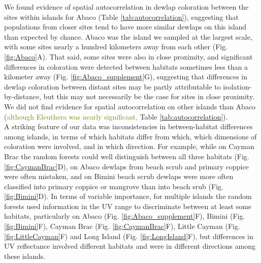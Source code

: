 We found evidence of spatial autocorrelation in dewlap coloration between the sites within islands for Abaco (Table \ref{tab:autocorrelation}), suggesting that populations from closer sites tend to have more similar dewlaps on this island than expected by chance. Abaco was the island we sampled at the largest scale, with some sites nearly a hundred kilometers away from each other (Fig. \ref{fig:Abaco}A). That said, some sites were also in close proximity, and significant differences in coloration were detected between habitats sometimes less than a kilometer away (Fig. \ref{fig:Abaco_supplement}G), suggesting that differences in dewlap coloration between distant sites may be partly attributable to isolation-by-distance, but this may not necessarily be the case for sites in close proximity. We did not find evidence for spatial autocorrelation on other islands than Abaco (\textcolor{olive}{although Eleuthera was nearly significant, }Table \ref{tab:autocorrelation}).\\

A striking feature of our data was inconsistencies in between-habitat differences among islands, in terms of which habitats differ from which, which dimensions of coloration were involved, and in which direction. For example, while on Cayman Brac the random forests could well distinguish between all three habitats (Fig. \ref{fig:CaymanBrac}D), on Abaco dewlaps from beach scrub and primary coppice were often mistaken, and on Bimini beach scrub dewlaps were more often classified into primary coppice or mangrove than into beach srub (Fig. \ref{fig:Bimini}D). In terms of variable importance, for multiple islands the random forests used information in the UV range to discriminate between at least some habitats, particularly on Abaco (Fig. \ref{fig:Abaco_supplement}F), Bimini (Fig. \ref{fig:Bimini}F), Cayman Brac (Fig. \ref{fig:CaymanBrac}F), Little Cayman (Fig. \ref{fig:LittleCayman}F) and Long Island (Fig. \ref{fig:LongIsland}F), but differences in UV reflectance involved different habitats and were in different directions among these islands.\\